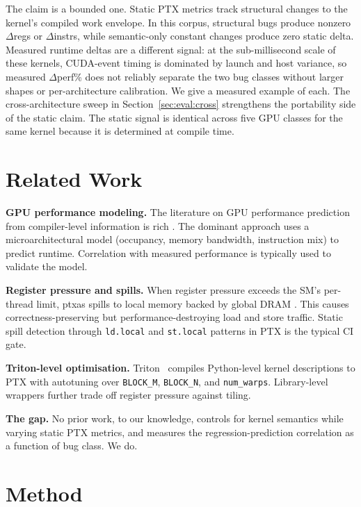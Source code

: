 \documentclass[runningheads]{llncs}
\begin{document}
The claim is a bounded one. Static PTX metrics track structural
changes to the kernel's compiled work envelope. In this corpus,
structural bugs produce nonzero $\Delta$regs or $\Delta$instrs,
while semantic-only constant changes produce zero static delta.
Measured runtime deltas are a different signal: at the
sub-millisecond scale of these kernels, CUDA-event timing is
dominated by launch and host variance, so measured $\Delta$perf\%
does not reliably separate the two bug classes without larger
shapes or per-architecture calibration. We give a measured example
of each. The cross-architecture sweep in
Section~\ref{sec:eval:cross} strengthens the portability side of
the static claim. The static signal is identical across five GPU
classes for the same kernel because it is determined at compile
time.

\section{Related Work}
\label{sec:related}

\textbf{GPU performance modeling.} The literature on GPU performance
prediction from compiler-level information is rich
\cite{gpgpu_latency2019,rndn2023}. The dominant approach uses a
microarchitectural model (occupancy, memory bandwidth, instruction mix)
to predict runtime. Correlation with measured performance is typically
used to validate the model.

\textbf{Register pressure and spills.} When register pressure exceeds
the SM's per-thread limit, ptxas spills to local memory backed by
global DRAM \cite{ptxasforum,regdem2019}. This causes
correctness-preserving but performance-destroying load and store
traffic. Static spill detection through \texttt{ld.local} and
\texttt{st.local} patterns in PTX is the typical CI gate.

\textbf{Triton-level optimisation.} Triton~\cite{triton2019} compiles
Python-level kernel descriptions to PTX with autotuning over
\texttt{BLOCK\_M}, \texttt{BLOCK\_N}, and \texttt{num\_warps}.
Library-level wrappers further trade off register pressure against
tiling.

\textbf{The gap.} No prior work, to our knowledge, controls for kernel
semantics while varying static PTX metrics, and measures the
regression-prediction correlation as a function of bug class. We do.

\section{Method}
\label{sec:method}
\end{document}
